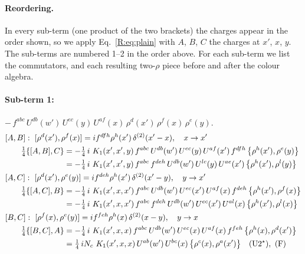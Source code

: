 \documentclass[10pt]{article}
\numberwithin{equation}{section}
\begin{document}
\paragraph{Reordering.} In every sub-term (one product of the two brackets) the charges appear in the order shown, so we apply Eq.~\eqref{R:eq:plain} with $A$, $B$, $C$ the charges at $x'$, $x$, $y$. The sub-terms are numbered 1--2 in the order above. For each sub-term we list the commutators, and each resulting two-$\rho$ piece before and after the colour algebra.
\paragraph{Sub-term 1:} $-\,f^{abc}\,U^{db}(w')\,U^{ec}(y)\,U^{af}(x)\,\rho^{d}(x')\,\rho^{f}(x)\,\rho^{e}(y)$.
\begin{align}
&[A,B]:\ [\rho^{d}(x'),\rho^{f}(x)]=i f^{dfh}\rho^{h}(x')\,\delta^{(2)}(x'-x),\quad x\to x'\notag\\
&\qquad \tfrac14\{[A,B],C\}=-\tfrac14\,i\,\,K_1(x',x',y)\,f^{abc}\,U^{db}(w')\,U^{ec}(y)\,U^{af}(x')\,f^{dfh}\,\big\{\rho^{h}(x'),\rho^{e}(y)\big\}\notag\\
&\qquad\phantom{\tfrac14\{[A,B],C\}}=-\tfrac14\,i\,\,K_1(x',x',y)\,f^{abc}\,f^{deh}\,U^{db}(w')\,U^{lc}(y)\,U^{ae}(x')\,\big\{\rho^{h}(x'),\rho^{l}(y)\big\}
\label{R:eq:B1-1-AB}\\
&[A,C]:\ [\rho^{d}(x'),\rho^{e}(y)]=i f^{deh}\rho^{h}(x')\,\delta^{(2)}(x'-y),\quad y\to x'\notag\\
&\qquad \tfrac14\{[A,C],B\}=-\tfrac14\,i\,\,K_1(x',x,x')\,f^{abc}\,U^{db}(w')\,U^{ec}(x')\,U^{af}(x)\,f^{deh}\,\big\{\rho^{h}(x'),\rho^{f}(x)\big\}\notag\\
&\qquad\phantom{\tfrac14\{[A,C],B\}}=-\tfrac14\,i\,\,K_1(x',x,x')\,f^{abc}\,f^{deh}\,U^{db}(w')\,U^{ec}(x')\,U^{al}(x)\,\big\{\rho^{h}(x'),\rho^{l}(x)\big\}
\label{R:eq:B1-1-AC}\\
&[B,C]:\ [\rho^{f}(x),\rho^{e}(y)]=i f^{feh}\rho^{h}(x)\,\delta^{(2)}(x-y),\quad y\to x\notag\\
&\qquad \tfrac14\{[B,C],A\}=-\tfrac14\,i\,\,K_1(x',x,x)\,f^{abc}\,U^{db}(w')\,U^{ec}(x)\,U^{af}(x)\,f^{feh}\,\big\{\rho^{h}(x),\rho^{d}(x')\big\}\notag\\
&\qquad\phantom{\tfrac14\{[B,C],A\}}=\tfrac14\,i N_{c}\,\,K_1(x',x,x)\,U^{ab}(w')\,U^{bc}(x)\,\big\{\rho^{c}(x),\rho^{a}(x')\big\}\quad\text{(U2$^\star$)},\ \text{(F)}
\label{R:eq:B1-1-BC}
\end{align}
\end{document}
